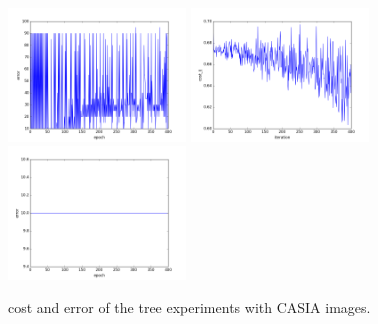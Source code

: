\begin{figure}[htb]
\includegraphics[width=0.42\textwidth]{images/redes/ejecucion1/general_svm_casia/minidataset_tested_itself/error.png}
\includegraphics[width=0.42\textwidth]{images/redes/ejecucion1/general_svm_casia/minidataset_tested_iteself_lr_0_001/cost.png}
\includegraphics[width=0.42\textwidth]{images/redes/ejecucion1/general_svm_casia/minidataset_tested_iteself_lr_0_001/error.png}
\caption{cost and error of the tree experiments with CASIA images.} \label{fig:casia-ejec1}
\end{figure}

